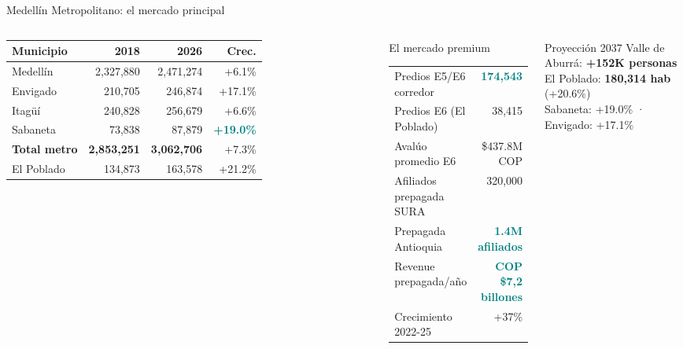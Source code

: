 \documentclass[aspectratio=169, 11pt]{beamer}
\newcommand{\highlight}[1]{\textcolor{teal}{\textbf{#1}}}
\newcommand{\src}[1]{\par\vspace{2pt}{\tiny\textcolor{slate}{Fuente: #1}}}
\begin{document}
\begin{frame}{Medellín Metropolitano: el mercado principal}

\begin{columns}[T]
\vspace{-2pt}
{\scriptsize\setlength{\tabcolsep}{3pt}
\begin{tabular}{@{}lrrr@{}}
\toprule
\textbf{Municipio} & \textbf{2018} & \textbf{2026} & \textbf{Crec.} \\
\midrule
\rowcolor{teal!8}
Medellín & 2,327,880 & 2,471,274 & +6.1\% \\
\rowcolor{teal!6}
Envigado & 210,705 & 246,874 & +17.1\% \\
Itagüí & 240,828 & 256,679 & +6.6\% \\
\rowcolor{teal!6}
Sabaneta & 73,838 & 87,879 & \highlight{+19.0\%} \\
\midrule
\textbf{Total metro} & \textbf{2,853,251} & \textbf{3,062,706} & +7.3\% \\
\midrule
\rowcolor{hptu!5}
El Poblado & 134,873 & 163,578 & +21.2\% \\
\bottomrule
\end{tabular}
}

\vspace{3pt}
\src{DANE CNPV 2018, DENSURBAM proyecciones tendenciales}

\begin{exampleblock}{\small El mercado premium}
\footnotesize
\begin{tabular}{@{}lr@{}}
Predios E5/E6 corredor & \highlight{174,543} \\
Predios E6 (El Poblado) & 38,415 \\
Avalúo promedio E6 & \$437.8M COP \\
Afiliados prepagada SURA & 320,000 \\
Prepagada Antioquia & \highlight{1.4M afiliados} \\
Revenue prepagada/año & \highlight{COP \$7,2 billones} \\
Crecimiento 2022-25 & +37\% \\
\end{tabular}
\end{exampleblock}

\vspace{2pt}
\begin{alertblock}{\small Proyección 2037}
\centering\footnotesize
Valle de Aburrá: \textbf{+152K personas}\\
El Poblado: \textbf{180,314 hab} (+20.6\%)\\
Sabaneta: +19.0\% · Envigado: +17.1\%
\end{alertblock}
\end{columns}
\end{frame}
\end{document}
